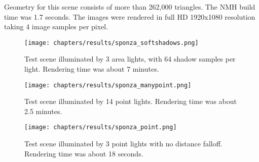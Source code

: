 Geometry for this scene consists of more than 262,000 triangles. The NMH build time was 1.7 seconds. The images were rendered in full HD 1920x1080 resolution taking 4 image samples per pixel.

\begin{figure}[htb]
  \begin{center}
    \texttt{[image: chapters/results/sponza\_softshadows.png]}
  \end{center}
  \caption{Test scene illuminated by 3 area lights, with 64 shadow samples per light. Rendering time was about 7 minutes.}
\end{figure}

\begin{figure}[htb]
  \begin{center}
    \texttt{[image: chapters/results/sponza\_manypoint.png]}
  \end{center}
  \caption{Test scene illuminated by 14 point lights. Rendering time was about 2.5 minutes.}
\end{figure}

\begin{figure}[htb]
  \begin{center}
    \texttt{[image: chapters/results/sponza\_point.png]}
  \end{center}
  \caption{Test scene illuminated by 3 point lights with no distance falloff. Rendering time was about 18 seconds.}
\end{figure}
